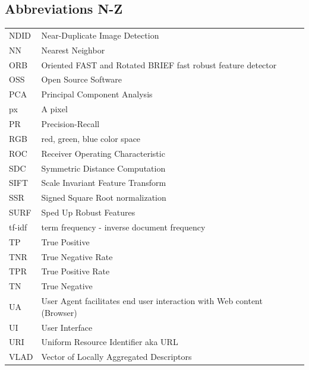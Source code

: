 \documentclass[english,12pt,a4paper,pdftex,elec,utf8, table]{aaltothesis}
\begin{document}
\clearpage
\subsection*{Abbreviations N-Z}
\begin{tabular}{ll}
  NDID & Near-Duplicate Image Detection\\
  NN & Nearest Neighbor\\
  ORB & Oriented FAST and Rotated BRIEF fast robust feature detector\\
  OSS & Open Source Software\\
  PCA & Principal Component Analysis\\
  px & A pixel  \\
  PR & Precision-Recall\\
  RGB & red, green, blue color space\\
  ROC & Receiver Operating Characteristic\\
  SDC & Symmetric Distance Computation\\
  SIFT & Scale Invariant Feature Transform \\
  SSR & Signed Square Root normalization\\
  SURF & Sped Up Robust Features \\
  tf-idf & term frequency - inverse document frequency\\
  TP & True Positive\\
  TNR & True Negative Rate\\
  TPR & True Positive Rate\\
  TN & True Negative\\
  UA   & User Agent facilitates end user interaction with Web content (Browser)\\
  UI   & User Interface\\
  URI  & Uniform Resource Identifier aka URL\\
  VLAD & Vector of Locally Aggregated Descriptors\\
\end{tabular}
\cleardoublepage
\storeinipagenumber
{}
\setcounter{page}{1}
\end{document}
